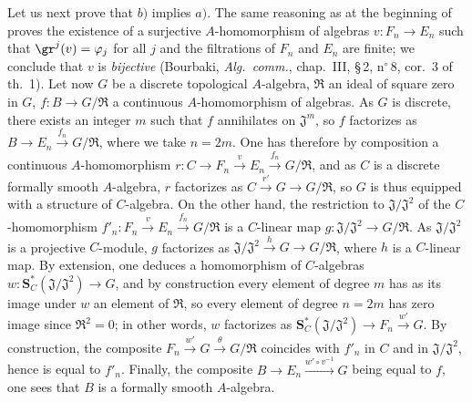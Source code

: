 \begin{env}[19.5.4.3]
\label{0.19.5.4.3}
Let us next prove that $b)$ implies $a)$.
The same reasoning as at the beginning of  proves the existence of a surjective $A$-homomorphism of algebras $v:F_n\to E_n$ such that $\gr^j(v)=\varphi_j$ for all $j$ and the filtrations of $F_n$ and $E_n$ are finite; we conclude that $v$ is \emph{bijective} (Bourbaki, \emph{Alg.\ comm.}, chap.~III, \S\,2, n$^\circ$\,8, cor.~3 of th.~1).
Let now $G$ be a discrete topological $A$-algebra, $\mathfrak{R}$ an ideal of square zero in $G$, $f:B\to G/\mathfrak{R}$ a continuous $A$-homomorphism of algebras.
As $G$ is discrete, there exists an integer $m$ such that $f$ annihilates on $\mathfrak{J}^m$, so $f$ factorizes as $B\to E_n\xrightarrow{f_n}G/\mathfrak{R}$, where we take $n=2m$.
One has therefore by composition a continuous $A$-homomorphism $r:C\to F_n\xrightarrow{v}E_n\xrightarrow{f_n}G/\mathfrak{R}$, and as $C$ is a discrete formally smooth $A$-algebra, $r$ factorizes as $C\xrightarrow{r'}G\to G/\mathfrak{R}$, so $G$ is thus equipped with a structure of $C$-algebra.
On the other hand, the restriction to $\mathfrak{J}/\mathfrak{J}^2$ of the $C$-homomorphism $f'_n:F_n\xrightarrow{v}E_n\xrightarrow{f_n}G/\mathfrak{R}$ is a $C$-linear map $g:\mathfrak{J}/\mathfrak{J}^2\to G/\mathfrak{R}$.
As $\mathfrak{J}/\mathfrak{J}^2$ is a projective $C$-module, $g$ factorizes as $\mathfrak{J}/\mathfrak{J}^2\xrightarrow{h}G\to G/\mathfrak{R}$, where $h$ is a $C$-linear map.
By extension, one deduces a homomorphism of $C$-algebras $w:\mathbf{S}_C^*(\mathfrak{J}/\mathfrak{J}^2)\to G$, and by construction every element of degree $m$ has as its image under $w$ an element of $\mathfrak{R}$, so every element of degree $n=2m$ has zero image since $\mathfrak{R}^2=0$;
in other words, $w$ factorizes as $\mathbf{S}_C^*(\mathfrak{J}/\mathfrak{J}^2)\to F_n\xrightarrow{w'}G$.
By construction, the composite $F_n\xrightarrow{w'}G\xrightarrow{\theta}G/\mathfrak{R}$ coincides with $f'_n$ in $C$ and in $\mathfrak{J}/\mathfrak{J}^2$, hence is equal to $f'_n$.
Finally, the composite $B\to E_n\xrightarrow{w'\circ v^{-1}}G$ being equal to $f$, one sees that $B$ is a formally smooth $A$-algebra.
\end{env}

